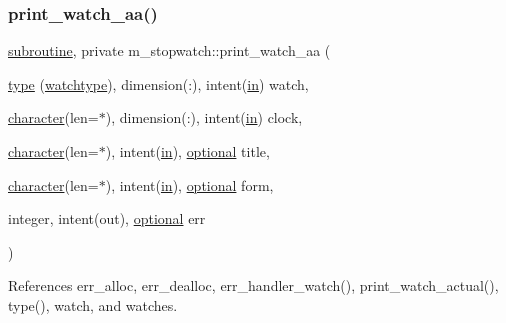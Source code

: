 \subsubsection{\texorpdfstring{print\+\_\+watch\+\_\+aa()}{print\_watch\_aa()}}
{\footnotesize\ttfamily \hyperlink{M__stopwatch_83_8txt_acfbcff50169d691ff02d4a123ed70482}{subroutine}, private m\+\_\+stopwatch\+::print\+\_\+watch\+\_\+aa (\begin{DoxyParamCaption}\item[{\hyperlink{stop__watch_83_8txt_a70f0ead91c32e25323c03265aa302c1c}{type} (\hyperlink{structm__stopwatch_1_1watchtype}{watchtype}), dimension(\+:), intent(\hyperlink{M__journal_83_8txt_afce72651d1eed785a2132bee863b2f38}{in})}]{watch,  }\item[{\hyperlink{option__stopwatch_83_8txt_abd4b21fbbd175834027b5224bfe97e66}{character}(len=$\ast$), dimension(\+:), intent(\hyperlink{M__journal_83_8txt_afce72651d1eed785a2132bee863b2f38}{in})}]{clock,  }\item[{\hyperlink{option__stopwatch_83_8txt_abd4b21fbbd175834027b5224bfe97e66}{character}(len=$\ast$), intent(\hyperlink{M__journal_83_8txt_afce72651d1eed785a2132bee863b2f38}{in}), \hyperlink{option__stopwatch_83_8txt_aa4ece75e7acf58a4843f70fe18c3ade5}{optional}}]{title,  }\item[{\hyperlink{option__stopwatch_83_8txt_abd4b21fbbd175834027b5224bfe97e66}{character}(len=$\ast$), intent(\hyperlink{M__journal_83_8txt_afce72651d1eed785a2132bee863b2f38}{in}), \hyperlink{option__stopwatch_83_8txt_aa4ece75e7acf58a4843f70fe18c3ade5}{optional}}]{form,  }\item[{integer, intent(out), \hyperlink{option__stopwatch_83_8txt_aa4ece75e7acf58a4843f70fe18c3ade5}{optional}}]{err }\end{DoxyParamCaption})\hspace{0.3cm}{\ttfamily [private]}}



References err\+\_\+alloc, err\+\_\+dealloc, err\+\_\+handler\+\_\+watch(), print\+\_\+watch\+\_\+actual(), type(), watch, and watches.

\mbox{\label{namespacem__stopwatch_a7c7423ee45c538535f59517d5a34abba}} 
